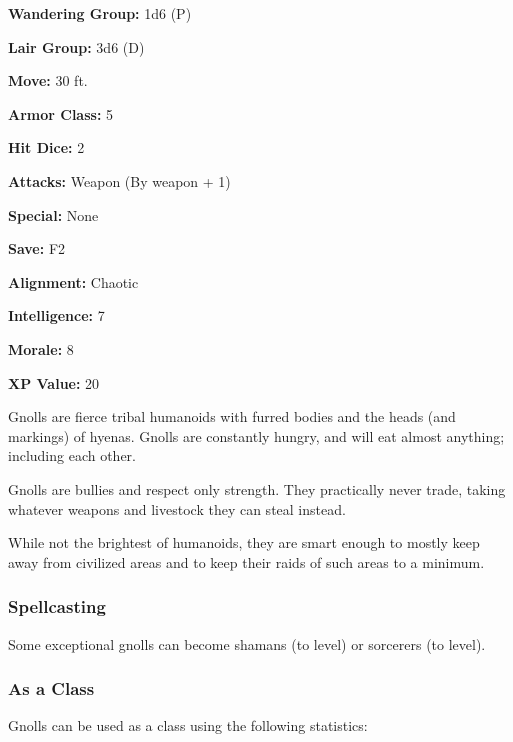 \begin{multicols*}{2}
{\textbf{Wandering Group:} 1d6 (P)

\textbf{Lair Group:} 3d6 (D)

\textbf{Move:} 30 ft.

\textbf{Armor Class:} 5

\textbf{Hit Dice:} 2

\textbf{Attacks:} Weapon (By weapon + 1)

\textbf{Special:} None

\textbf{Save:} F2

\textbf{Alignment:} Chaotic

\textbf{Intelligence:} 7

\textbf{Morale:} 8

\textbf{XP Value:} 20}

Gnolls are fierce tribal humanoids with furred bodies and the heads (and markings) of hyenas. Gnolls are constantly hungry, and will eat almost anything; including each other.

Gnolls are bullies and respect only strength. They practically never trade, taking whatever weapons and livestock they can steal instead.

While not the brightest of humanoids, they are smart enough to mostly keep away from civilized areas and to keep their raids of such areas to a minimum.

\subsubsection{Spellcasting}
Some exceptional gnolls can become shamans (to  level) or sorcerers (to  level).

\subsubsection{As a Class}
Gnolls can be used as a class using the following statistics:

\end{multicols*}
